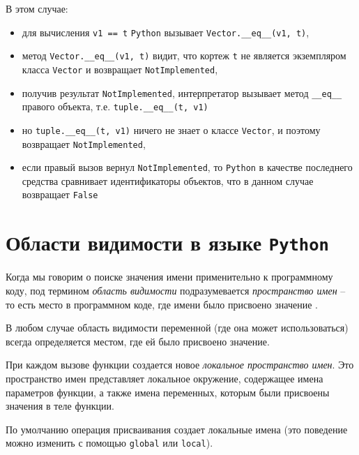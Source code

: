 \documentclass[%
	11pt,
	a4paper,
	utf8,
		]{article}
\begin{document}
В этом случае:

\begin{itemize}
	\item для вычисления \texttt{v1 == t} \texttt{Python} вызывает \texttt{Vector.\_\_eq\_\_(v1, t)},
	
	\item метод \texttt{Vector.\_\_eq\_\_(v1, t)} видит, что кортеж \texttt{t} не является экземпляром класса \texttt{Vector} и возвращает \texttt{NotImplemented},
	
	\item получив результат \texttt{NotImplemented}, интерпретатор вызывает метод \texttt{\_\_eq\_\_} правого объекта, т.е. \texttt{tuple.\_\_eq\_\_(t, v1)}
	
	\item но \texttt{tuple.\_\_eq\_\_(t, v1)} ничего не знает о классе \texttt{Vector}, и поэтому возвращает \texttt{NotImplemented},
	
	\item если правый вызов вернул \texttt{NotImplemented}, то \texttt{Python} в качестве последнего средства сравнивает идентификаторы объектов, что в данном случае возвращает \texttt{False}
\end{itemize}




 
\section{Области видимости в языке \texttt{Python}}

Когда мы говорим о поиске значения имени применительно к программному коду, под термином \emph{область видимости} подразумевается \emph{пространство имен} -- то есть место в программном коде, где имени было присвоено значение \cite{lutz:learningpython-2011}.

В любом случае область видимости переменной (где она может использоваться) всегда определяется местом, где ей было присвоено значение.


При каждом вызове функции создается новое \emph{локальное пространство имен}. Это пространство имен представляет локальное окружение, содержащее имена параметров функции, а также имена переменных, которым были присвоены значения в теле функции.

По умолчанию операция присваивания создает локальные имена (это поведение можно изменить с помощью \texttt{global} или \texttt{local}).
\end{document}
